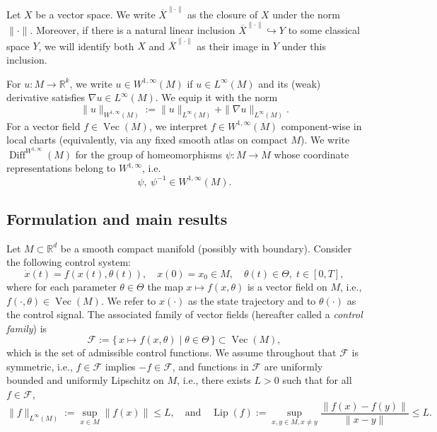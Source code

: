 \documentclass[12pt]{amsart}
\numberwithin{equation}{section}
\theoremstyle{remark}
\newcommand{\ql}[1]{\texttt{\color{cyan} QL: \footnotesize #1}}
\begin{document}
Let $X$ be a vector space. We write $\overline{X}^{\|\cdot \|}$ as the closure of $X$ under the norm $\|\cdot\|$. Moreover, if there is a natural linear inclusion $\overline{X}^{\|\cdot\|} \hookrightarrow Y$ to some classical space $Y$, we will identify both $X$ and $\overline{X}^{\|\cdot\|}$ as their image in $Y$ under this inclusion.

For $u:M\to\mathbb R^k$, we write $u\in W^{1,\infty}(M)$ if $u\in L^\infty(M)$ and its (weak) derivative satisfies $\nabla u\in L^\infty(M)$.
We equip it with the norm
\begin{equation}
\|u\|_{W^{1,\infty}(M)} := \|u\|_{L^\infty(M)} + \|\nabla u\|_{L^\infty(M)}.
\end{equation}
For a vector field $f\in \operatorname{Vec}(M)$, we interpret $f\in W^{1,\infty}(M)$ component-wise in local charts (equivalently, via any fixed smooth atlas on compact $M$).
We write $\operatorname{Diff}^{W^{1,\infty}}(M)$ for the group of homeomorphisms
$\psi:M\to M$ whose coordinate representations belong to $W^{1,\infty}$, i.e.
\begin{equation}
\psi,\ \psi^{-1} \in W^{1,\infty}(M).
\end{equation}


\subsection{Formulation and main results}
Let $M\subset \mathbb R^d$ be a smooth compact manifold (possibly with boundary). Consider the following control system:
\begin{equation}
    \label{eq:control_system}
    \dot x(t)  = f(x(t), \theta(t)), \quad x(0) = x_0 \in M,\quad \theta(t)\in \Theta,\; t\in [0,T],
\end{equation}
where for each parameter $\theta\in\Theta$ the map $x\mapsto f(x,\theta)$ is a vector field on $M$, i.e., $f(\cdot,\theta)\in \operatorname{Vec}(M)$. We refer to $x(\cdot)$ as the state trajectory and to $\theta(\cdot)$ as the control signal. The associated
family of vector fields (hereafter called a \emph{control family}) is
\begin{equation}
    \mathcal F :=\{\,x\mapsto f(x, \theta)\mid \theta \in \Theta\,\}\subset \operatorname{Vec}(M),
\end{equation}
which is the set of admissible control functions. We assume throughout that $\mathcal F$ is symmetric, i.e., $f\in \mathcal F$ implies $-f\in \mathcal F$, and functions in $\mathcal F$ are uniformly bounded and uniformly Lipschitz on $M$, i.e., there exists $L>0$ such that for all $f\in \mathcal F$,
\begin{equation}
    \|f\|_{L^\infty(M)}:=\sup_{x\in M} \|f(x)\|\le L,\quad \text{and}\quad \operatorname{Lip}(f):=\sup_{x,y\in M, x\neq y} \frac{\|f(x)-f(y)\|}{\|x-y\|}\le L.
\end{equation}
\end{document}
